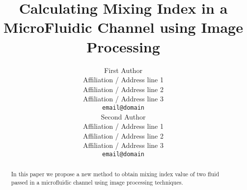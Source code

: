\documentclass[11pt,a4paper]{article}
\title{Calculating Mixing Index in a MicroFluidic Channel using Image Processing}
\author{First Author \\
  Affiliation / Address line 1 \\
  Affiliation / Address line 2 \\
  Affiliation / Address line 3 \\
  \texttt{email@domain} \\\And
  Second Author \\
  Affiliation / Address line 1 \\
  Affiliation / Address line 2 \\
  Affiliation / Address line 3 \\
  \texttt{email@domain} \\}
\date{}
\begin{document}
\maketitle
\begin{abstract}
In this paper we propose a new method to obtain mixing index value of two fluid passed in a microfluidic channel using image processing techniques.
\end{abstract}


% 
% 
% 
% 
% 



\end{document}
